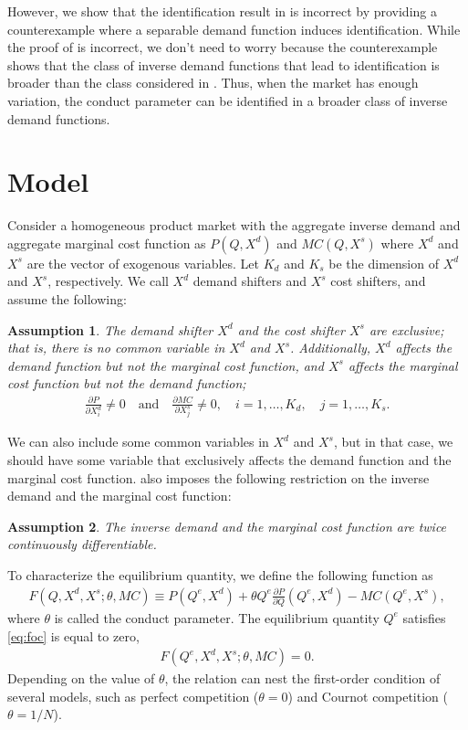 \documentclass[11pt, a4paper]{article}
\newtheorem{assumption}{Assumption}
\theoremstyle{remark}
\begin{document}
However, we show that the identification result in \citet{lau1982identifying} is incorrect by providing a counterexample where a separable demand function induces identification.
While the proof of \citet{lau1982identifying} is incorrect, we don't need to worry because the counterexample shows that the class of inverse demand functions that lead to identification is broader than the class considered in \citet{lau1982identifying}.
Thus, when the market has enough variation, the conduct parameter can be identified in a broader class of inverse demand functions.


\section{Model}\label{sec:model}
Consider a homogeneous product market with the aggregate inverse demand and aggregate marginal cost function as $P(Q, X^{d})$ and $MC(Q, X^{s})$ where $X^{d}$ and $X^{s}$ are the vector of exogenous variables.
Let $K_d$ and $K_s$ be the dimension of $X^{d}$ and $X^{s}$, respectively.
We call $X^{d}$ demand shifters and $X^{s}$ cost shifters, and assume the following:
\begin{assumption}\label{assumption:exclusive_shifters}
    The demand shifter $X^{d}$ and the cost shifter $X^{s}$ are exclusive; that is, there is no common variable in $X^{d}$ and $X^{s}$.
    Additionally, $X^{d}$ affects the demand function but not the marginal cost function, and $X^{s}$ affects the marginal cost function but not the demand function;
    \begin{align}
        \frac{\partial P}{\partial X^{d}_{i}} \ne 0 \quad \text{and} \quad \frac{\partial MC}{\partial X^{s}_{j}} \ne 0, \quad i = 1, \ldots, K_d, \quad j = 1, \ldots, K_s.
    \end{align}
\end{assumption}
We can also include some common variables in $X^{d}$ and $X^{s}$, but in that case, we should have some variable that exclusively affects the demand function and the marginal cost function.
\citet{lau1982identifying} also imposes the following restriction on the inverse demand and the marginal cost function:
\begin{assumption}\label{assumption:twice_differentiable}
    The inverse demand and the marginal cost function are twice continuously differentiable.
\end{assumption}

To characterize the equilibrium quantity, we define the following function as
\begin{align}
    F(Q, X^{d}, X^{s}; \theta, MC) \equiv P(Q^e, X^{d}) + \theta Q^e\frac{\partial P}{\partial Q}(Q^e, X^{d}) - MC(Q^e, X^{s}),\label{eq:foc}
\end{align}
where $\theta$ is called the conduct parameter.
The equilibrium quantity $Q^e$ satisfies \eqref{eq:foc} is equal to zero,
\begin{align}
    F(Q^e, X^{d}, X^{s}; \theta, MC) = 0.
\end{align}
Depending on the value of $\theta$, the relation can nest the first-order condition of several models, such as perfect competition ($\theta=0$) and Cournot competition ($\theta=1/N$).
\end{document}
